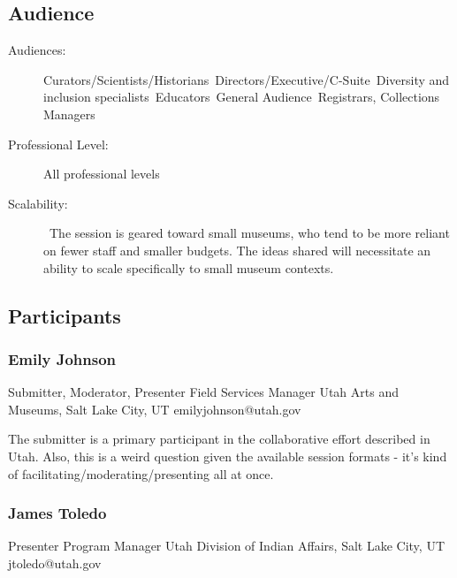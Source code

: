\documentclass{report}
\begin{document}
              \subsection*{Audience}
                \begin{description}
                  \item [Audiences:]Curators/Scientists/Historians~Directors/Executive/C-Suite~Diversity and inclusion specialists~Educators~General Audience~Registrars, Collections Managers~
                  \item[Professional Level:]All professional levels~
                \item[Scalability:]  The session is geared toward small museums, who tend to be more reliant on fewer staff and smaller budgets. The ideas shared will necessitate an ability to scale specifically to small museum contexts. 

							
              \end{description}
            \subsection*{Participants}
              \subsubsection*{ Emily Johnson }
              Submitter, Moderator, Presenter\newline
              Field Services Manager\newline
              Utah Arts and Museums, Salt Lake City, UT
              \newline
              emilyjohnson@utah.gov\newline
              
              

              The submitter is a primary participant in the collaborative effort described in Utah. Also, this is a weird question given the available session formats - it's kind of facilitating/moderating/presenting all at once.\newline


              

              
                \subsubsection*{ James Toledo }
                Presenter\newline
                Program Manager\newline
                Utah Division of Indian Affairs, Salt Lake City, UT
                \newline
                jtoledo@utah.gov\newline
                
\end{document}
